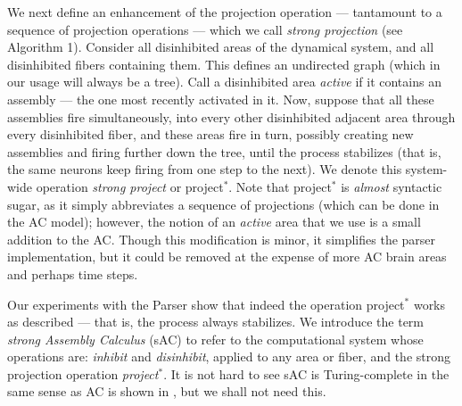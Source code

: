 \documentclass[11pt,a4paper]{article}
\begin{document}
We next define an enhancement of the projection operation --- tantamount to a sequence of projection operations --- which we call {\em strong projection} (see Algorithm 1). Consider all disinhibited areas of the dynamical system, and all disinhibited fibers containing them.  This defines an undirected graph (which in our usage will always be a tree).  Call a disinhibited area {\em active} if it contains an assembly --- the one most recently activated in it.  Now, suppose that all these assemblies fire simultaneously, into every other disinhibited adjacent area through every disinhibited fiber, and these areas fire in turn, possibly creating new assemblies and firing further down the tree, until the process stabilizes (that is, the same neurons keep firing from one step to the next). We denote this system-wide operation {\em strong project} or project$^*$. Note that project$^*$ is {\em almost} syntactic sugar, as it simply abbreviates a sequence of projections (which can be done in the AC model); however, the notion of an {\em active} area that we use is a small addition to the AC. Though this modification is minor, it simplifies the parser implementation, but it could be removed at the expense of more AC brain areas and perhaps time steps. 

Our experiments with the Parser show that indeed the operation project$^*$ works as described --- that is, the process always stabilizes.   
We introduce the term {\em strong Assembly Calculus} (sAC) to refer to the computational system whose operations are: {\em inhibit} and {\em disinhibit}, applied to any area or fiber, and the strong projection operation {\em project$^*$}.  It is not hard to see sAC is Turing-complete in the same sense as AC is shown in \citet{PNAS}, but we shall not need this.

\begin{algorithm}
\BlankLine
{}
\BlankLine
{}
\caption{AC code for project*}
\end{algorithm}
\end{document}

